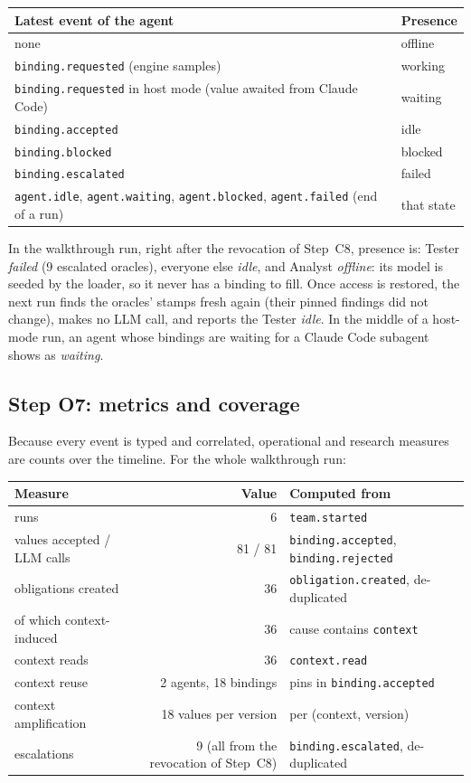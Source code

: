 \documentclass[10pt,a4paper]{article}
\newcommand{\code}[1]{\texttt{#1}}
\theoremstyle{definition}
\begin{document}
\begin{center}\small
\begin{tabular}{@{}l l@{}}
\toprule
Latest event of the agent & Presence \\
\midrule
none & offline \\
\code{binding.requested} (engine samples) & working \\
\code{binding.requested} in host mode (value awaited from Claude Code) & waiting \\
\code{binding.accepted} & idle \\
\code{binding.blocked} & blocked \\
\code{binding.escalated} & failed \\
\code{agent.idle}, \code{agent.waiting}, \code{agent.blocked}, \code{agent.failed} (end of a run) & that state \\
\bottomrule
\end{tabular}
\end{center}

\noindent In the walkthrough run, right after the revocation of Step~C8,
presence is: Tester \emph{failed} (9 escalated oracles), everyone else
\emph{idle}, and Analyst \emph{offline}: its model is seeded by the loader,
so it never has a binding to fill. Once access is restored, the next run
finds the oracles' stamps fresh again (their pinned findings did not change),
makes no LLM call, and reports the Tester \emph{idle}. In the middle of a
host-mode run, an agent whose bindings are waiting for a Claude Code subagent
shows as \emph{waiting}.

\subsection{Step O7: metrics and coverage}\label{sec:obs-metrics}

Because every event is typed and correlated, operational and research
measures are counts over the timeline. For the whole walkthrough run:

\begin{center}\small
\begin{tabular}{@{}l r l@{}}
\toprule
Measure & Value & Computed from \\
\midrule
runs & 6 & \code{team.started} \\
values accepted / LLM calls & 81 / 81 & \code{binding.accepted}, \code{binding.rejected} \\
obligations created & 36 & \code{obligation.created}, de-duplicated \\
\quad of which context-induced & 36 & cause contains \code{context} \\
context reads & 36 & \code{context.read} \\
context reuse & 2 agents, 18 bindings & pins in \code{binding.accepted} \\
context amplification & 18 values per version & per (context, version) \\
escalations & 9 (all from the revocation of Step~C8) & \code{binding.escalated}, de-duplicated \\
\bottomrule
\end{tabular}
\end{center}
\end{document}
